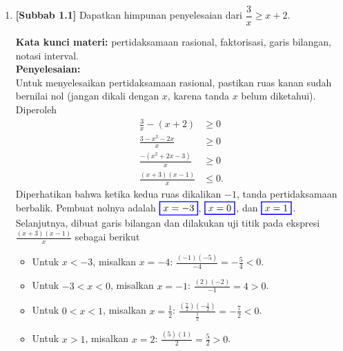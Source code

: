 \documentclass[10pt,openany,a4paper]{article}
\theoremstyle{definition}
\theoremstyle{definition}
\theoremstyle{plain}
\newenvironment{jawab}[2][tes]{%
\par\noindent\textbf{Kata kunci materi:} #1.\\
\textbf{Penyelesaian:} #2%
}{}
\begin{document}
\begin{enumerate}
    \item \textbf{[Subbab 1.1]} Dapatkan himpunan penyelesaian dari $\dfrac{3}{x}\geq x+2$.
    \begin{jawab}[pertidaksamaan rasional, faktorisasi, garis bilangan, notasi interval]{~\\
        Untuk menyelesaikan pertidaksamaan rasional, pastikan ruas kanan sudah bernilai nol (jangan dikali dengan $x$, karena tanda $x$ belum diketahui). Diperoleh
        \begin{align*}
            \frac{3}{x}-(x+2) &\geq 0\\
            \frac{3-x^2-2x}{x} &\geq 0\\
            \frac{-(x^2+2x-3)}{x} &\geq 0\\
            \frac{(x+3)(x-1)}{x} &\leq 0.
        \end{align*}
        Diperhatikan bahwa ketika kedua ruas dikalikan $-1$, tanda pertidaksamaan berbalik. Pembuat nolnya adalah $\colorlet{oldcolor}{.}
        \color{blue}
        \setlength{\fboxrule}{1pt} \boxed{\color{oldcolor}x=-3}\color{oldcolor}$, $\colorlet{oldcolor}{.}
        \color{blue}
        \setlength{\fboxrule}{1pt} \boxed{\color{oldcolor}x=0}\color{oldcolor}$, dan $\colorlet{oldcolor}{.}
        \color{blue}
        \setlength{\fboxrule}{1pt} \boxed{\color{oldcolor}x=1}\color{oldcolor}$. Selanjutnya, dibuat garis bilangan dan dilakukan uji titik pada ekspresi $\frac{(x+3)(x-1)}{x}$ sebagai berikut
        \begin{itemize}
            \item Untuk \(x < -3\), misalkan \(x = -4\): $\displaystyle\frac{(-1)(-5)}{-4} = -\frac{5}{4} < 0$.
            \item Untuk \(-3 < x < 0\), misalkan \(x = -1\): $\displaystyle\frac{(2)(-2)}{-1} = 4 > 0$.
            \item Untuk \(0 < x < 1\), misalkan \(x = \frac{1}{2}\): $\displaystyle\frac{\left(\frac{7}{2}\right)\left(-\frac{1}{2}\right)}{\frac{1}{2}} = -\frac{7}{2} < 0$.
            \item Untuk \(x > 1\), misalkan \(x = 2\): $\displaystyle\frac{(5)(1)}{2} = \frac{5}{2} > 0$.
        \end{itemize}
        \begin{center}

\end{center}}
\end{jawab}
\end{enumerate}
\end{document}
